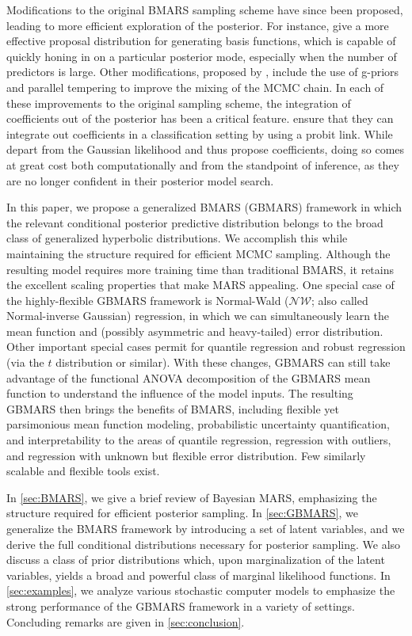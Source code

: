 \documentclass{article} %
\begin{document}
Modifications to the original BMARS sampling scheme have since been proposed, leading to more efficient exploration of the posterior. For instance, \cite{nott2005} give a more effective proposal distribution for generating basis functions, which is capable of quickly honing in on a particular posterior mode, especially when the number of predictors is large. Other modifications, proposed by \cite{francom2018}, include the use of g-priors and parallel tempering to improve the mixing of the MCMC chain. In each of these improvements to the original sampling scheme, the integration of coefficients out of the posterior has been a critical feature. \cite{holmes2003classification} ensure that they can integrate out coefficients in a classification setting by using a probit link. While \cite{mallick1999} depart from the Gaussian likelihood and thus propose coefficients, doing so comes at great cost both computationally and from the standpoint of inference, as they are no longer confident in their posterior model search. 

In this paper, we propose a generalized BMARS (GBMARS) framework in which the relevant conditional posterior predictive distribution belongs to the broad class of generalized hyperbolic distributions. We accomplish this while maintaining the structure required for efficient MCMC sampling. Although the resulting model requires more training time than traditional BMARS, it retains the excellent scaling properties that make MARS appealing. One special case of the highly-flexible GBMARS framework is Normal-Wald ($\mathcal{NW}$; also called Normal-inverse Gaussian) regression, in which we can simultaneously learn the mean function and (possibly asymmetric and heavy-tailed) error distribution. Other important special cases permit for quantile regression and robust regression (via the $t$ distribution or similar). With these changes, GBMARS can still take advantage of the functional ANOVA decomposition of the GBMARS mean function to understand the influence of the model inputs. The resulting GBMARS then brings the benefits of BMARS, including flexible yet parsimonious mean function modeling, probabilistic uncertainty quantification, and interpretability to the areas of quantile regression, regression with outliers, and regression with unknown but flexible error distribution.  Few similarly scalable and flexible tools exist.

In \cref{sec:BMARS}, we give a brief review of Bayesian MARS, emphasizing the structure required for efficient posterior sampling. In \cref{sec:GBMARS}, we generalize the BMARS framework by introducing a set of latent variables, and we derive the full conditional distributions necessary for posterior sampling. We also discuss a class of prior distributions which, upon marginalization of the latent variables, yields a broad and powerful class of marginal likelihood functions. In \cref{sec:examples}, we analyze various stochastic computer models to emphasize the strong performance of the GBMARS framework in a variety of settings. Concluding remarks are given in \cref{sec:conclusion}.
\end{document}
